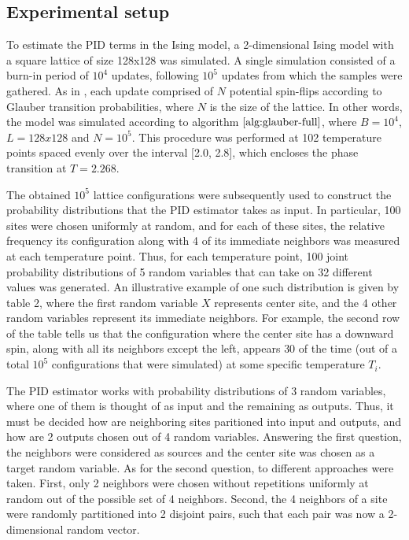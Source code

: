 \documentclass[12pt]{article}
\begin{document}
\subsection{Experimental setup}

To estimate the PID terms in the Ising model, a 2-dimensional Ising model with a square lattice of size 128x128 was simulated. A single simulation consisted of a burn-in period of $10^4$ updates, following $10^5$ updates from which the samples were gathered. As in \cite{barnett-ising}, each update comprised of $N$ potential spin-flips according to Glauber transition probabilities, where $N$ is the size of the lattice. In other words, the model was simulated according to algorithm $\ref{alg:glauber-full}$, where $B=10^4$, $L=128x128$ and $N=10^5$. This procedure was performed at 102 temperature points spaced evenly over the interval [2.0, 2.8], which encloses the phase transition at $T = 2.268$. 

The obtained $10^5$ lattice configurations were subsequently used to construct the probability distributions that the PID estimator takes as input. In particular, 100 sites were chosen uniformly at random, and for each of these sites, the relative frequency its configuration along with 4 of its immediate neighbors was measured at each temperature point. Thus, for each temperature point, 100 joint probability distributions of 5 random variables that can take on 32 different values was generated. An illustrative example of one such distribution is given by table 2, where the first random variable $X$ represents center site, and the 4 other random variables represent its immediate neighbors. For example, the second row of the table tells us that the configuration where the center site has a downward spin, along with all its neighbors except the left, appears $30$ of the time (out of a total $10^5$ configurations that were simulated) at some specific temperature $T_i$. 

The PID estimator works with probability distributions of 3 random variables, where one of them is thought of as input and the remaining as outputs. Thus, it must be decided how are neighboring sites paritioned into input and outputs, and how are 2 outputs chosen out of 4 random variables. Answering the first question, the neighbors were considered as sources and the center site was chosen as a target random variable. As for the second question, to different approaches were taken. First, only 2 neighbors were chosen without repetitions uniformly at random out of the possible set of 4 neighbors. Second, the 4 neighbors of a site were randomly partitioned into 2 disjoint pairs, such that each pair was now a 2-
dimensional random vector.
\end{document}
